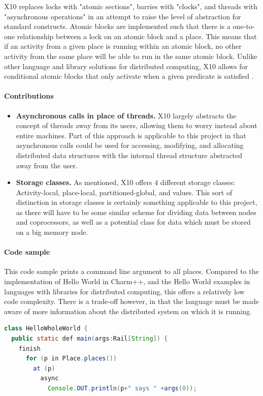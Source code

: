 X10 replaces locks with "atomic sections", barries with "clocks", and threads with "asynchronous operations" in an attempt to raise the level of abstraction for standard constructs. Atomic blocks are implemented such that there is a one-to-one relationship between a lock on an atomic block and a place. This means that if an activity from a given place is running within an atomic block, no other activity from the same place will be able to run in the same atomic block. Unlike other language and library solutions for distributed computing, X10 allows for conditional atomic blocks that only activate when a given predicate is satisfied \cite{X10_2005}. 

\paragraph{Contributions}
\begin{itemize}
	\item \textbf{Asynchronous calls in place of threads.} X10 largely abstracts the concept of threads away from its users, allowing them to worry instead about entire machines. Part of this approach is applicable to this project in that asynchronous calls could be used for accessing, modifying, and allocating distributed data structures with the internal thread structure abstracted away from the user. 

	\item \textbf{Storage classes.} As mentioned, X10 offers 4 different storage classes: Activity-local, place-local, partitioned-global, and values. This sort of distinction in storage classes is certainly something applicable to this project, as there will have to be some similar scheme for dividing data between nodes and coprocessors, as well as a potential class for data which must be stored on a big memory node. 

\end{itemize}

\paragraph{Code sample}
This code sample prints a command line argument to all places. Compared to the implementation of Hello World in Charm++, and the Hello World examples in languages with libraries for distributed computing, this offers a relatively low code complexity. There is a trade-off however, in that the language must be made aware of more information about the distributed system on which it is running. 
\begin{lstlisting}[language=Java, caption=Hello World in X10 from \cite{X10_site}]
class HelloWholeWorld {
  public static def main(args:Rail[String]) {
    finish
	  for (p in Place.places())
	    at (p)
		  async
		    Console.OUT.println(p+" says " +args(0));
\end{lstlisting}


